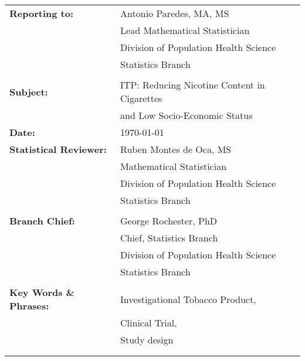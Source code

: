 \documentclass[A4,12pt]{article}%
\begin{document}
\begin{tabular}[h!]{p{2in} p{10in}}
	\rule{0pt}{4ex}\textbf{Reporting to:}          & Antonio Paredes, MA, MS \\
																							   & Lead Mathematical Statistician\\
																							   & Division of Population Health Science\\
                                                 & Statistics Branch\\
																							   &\\
	\rule{0pt}{4ex}\textbf{Subject:}               & ITP: Reducing Nicotine Content in Cigarettes\\
																								 & and Low Socio-Economic Status\\ 	
	\rule{0pt}{4ex}\textbf{Date:}                  & \today\\
	\rule{0pt}{4ex}\textbf{Statistical Reviewer:}  & Ruben Montes de Oca, MS \\
																							   & Mathematical Statistician\\
																							   & Division of Population Health Science\\
                                                 & Statistics Branch\\
																							   &\\
	\rule{0pt}{4ex}\textbf{Branch Chief:}          & George Rochester, PhD \\
																							   & Chief, Statistics Branch\\
																							   & Division of Population Health Science\\
                                                 & Statistics Branch\\
                                                 &\\
	\rule{0pt}{4ex}\textbf{Key Words \& Phrases:}  & Investigational Tobacco Product,\\
																								 & Clinical Trial,\\
																								 & Study design\\
		\mbox{$\quad$} \\
		\mbox{$\quad$} \\
\end{tabular}
\newpage

\end{document}
